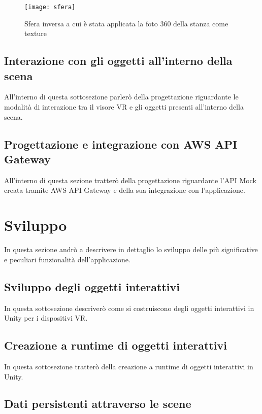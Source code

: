 \label{Sfera}
\begin{figure}[ht]
	\begin{center}
		\texttt{[image: sfera]}
		\caption{Sfera inversa a cui è stata applicata la foto 360 della stanza come texture}
	\end{center}
\end{figure}
\FloatBarrier  

\subsection{Interazione con gli oggetti all'interno della scena} 

All'interno di questa sottosezione parlerò della progettazione riguardante le modalità di interazione tra il visore VR e gli oggetti presenti all'interno della scena.

\subsection{Progettazione e integrazione con AWS API Gateway}

All'interno di questa sezione tratterò della progettazione riguardante l'API Mock creata tramite AWS API Gateway e della sua integrazione con l'applicazione.

\section{Sviluppo}

In questa sezione andrò a descrivere in dettaglio lo sviluppo delle più significative e peculiari funzionalità dell'applicazione.

\subsection{Sviluppo degli oggetti interattivi}

In questa sottosezione descriverò come si costruiscono degli oggetti interattivi in Unity per i dispositivi VR.

\subsection{Creazione a runtime di oggetti interattivi}

In questa sottosezione tratterò della creazione a runtime di oggetti interattivi in Unity.

\subsection{Dati persistenti attraverso le scene}


